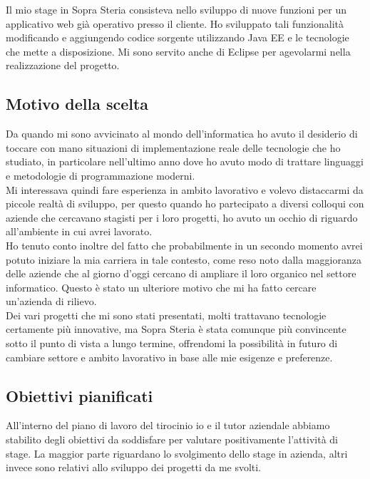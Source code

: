 Il mio stage in Sopra Steria consisteva nello sviluppo di nuove funzioni per un applicativo web già operativo presso il cliente. Ho sviluppato tali funzionalità modificando e aggiungendo codice sorgente utilizzando Java EE e le tecnologie che mette a disposizione. Mi sono servito anche di Eclipse per agevolarmi nella realizzazione del progetto.

	\subsection{Motivo della scelta}
	
	Da quando mi sono avvicinato al mondo dell'informatica ho avuto il desiderio di toccare con mano situazioni di implementazione reale delle tecnologie che ho studiato, in particolare nell'ultimo anno dove ho avuto modo di trattare linguaggi e metodologie di programmazione moderni.\\
	
	Mi interessava quindi fare esperienza in ambito lavorativo e volevo distaccarmi da piccole realtà di sviluppo, per questo quando ho partecipato a diversi colloqui con aziende che cercavano stagisti per i loro progetti, ho avuto un occhio di riguardo all'ambiente in cui avrei lavorato.\\
	
	Ho tenuto conto inoltre del fatto che probabilmente in un secondo momento avrei potuto iniziare la mia carriera in tale contesto, come reso noto dalla maggioranza delle aziende che al giorno d'oggi cercano di ampliare il loro organico nel settore informatico. Questo è stato un ulteriore motivo che mi ha fatto cercare un'azienda di rilievo.\\
	
	Dei vari progetti che mi sono stati presentati, molti trattavano tecnologie certamente più innovative, ma Sopra Steria è stata comunque più convincente	sotto il punto di vista a lungo termine, offrendomi la possibilità in futuro di cambiare settore e ambito lavorativo in base alle mie esigenze e preferenze.
	
	\subsection{Obiettivi pianificati}
	
	All'interno del piano di lavoro del tirocinio io e il tutor aziendale abbiamo stabilito degli obiettivi da soddisfare per valutare positivamente l'attività di stage. La maggior parte riguardano lo svolgimento dello stage in azienda, altri invece sono relativi allo sviluppo dei progetti da me svolti. \\
	
